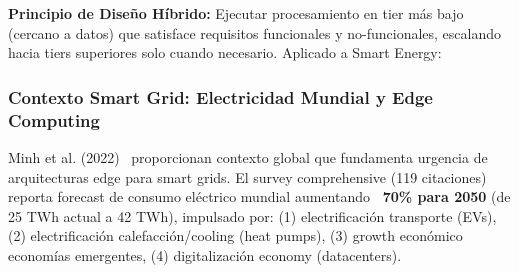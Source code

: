 \textbf{Principio de Diseño Híbrido:} Ejecutar procesamiento en tier más bajo (cercano a datos) que satisface requisitos funcionales y no-funcionales, escalando hacia tiers superiores solo cuando necesario. Aplicado a Smart Energy:

\begin{table}[H]
\centering
\caption{Distribución Óptima de Workloads Edge vs Cloud para Smart Energy}
\label{tab:edge-cloud-workload-distribution}
\small
{}
\end{table}

\subsubsection{Contexto Smart Grid: Electricidad Mundial y Edge Computing}

Minh et al. (2022)~\cite{minhEdgeComputingIoTEnabled2022} proporcionan contexto global que fundamenta urgencia de arquitecturas edge para smart grids. El survey comprehensive (119 citaciones) reporta forecast de consumo eléctrico mundial aumentando \textbf{~70\% para 2050} (de 25 TWh actual a 42 TWh), impulsado por: (1) electrificación transporte (EVs), (2) electrificación calefacción/cooling (heat pumps), (3) growth económico economías emergentes, (4) digitalización economy (datacenters).

